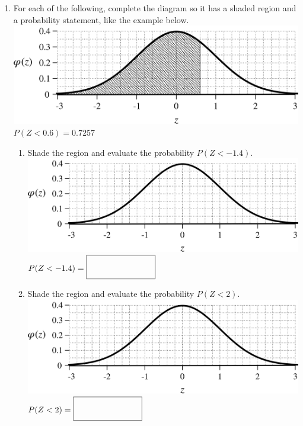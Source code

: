 \documentclass[12pt,letterpaper]{article}
\begin{document}
{\tiny 
\begin{center}
\begin{multicols}{8}

\end{multicols}
\end{center}
}

\newpage
\newcommand{\emptybox}{\fbox{\text{ }\hspace{60pt}\text{ \phantom{$\cfrac{h}{h}$} }}}
\begin{enumerate}
\item For each of the following, complete the diagram so it has a shaded region and a probability statement, like the example below.
\\\includegraphics[scale=0.7]{0p6.png} $P(Z<0.6) = 0.7257$
\begin{enumerate}
\vfill
\item Shade the region and evaluate the probability $P(Z<-1.4)$.
\\\includegraphics[scale=0.7]{blank.png} $P(Z<-1.4)=\emptybox$
\vfill
\item Shade the region and evaluate the probability $P(Z<2)$.
\\\includegraphics[scale=0.7]{blank.png} $P(Z<2)=\emptybox$

\end{enumerate}
\end{enumerate}
\end{document}
